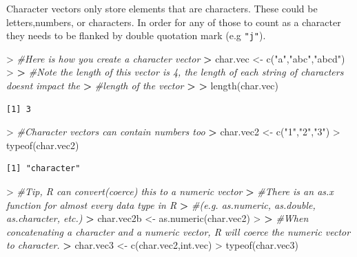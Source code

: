 \documentclass[
]{book}
\newenvironment{Shaded}{\begin{snugshade}}{\end{snugshade}}
\newcommand{\CommentTok}[1]{\textcolor[rgb]{0.56,0.35,0.01}{\textit{#1}}}
\newcommand{\ErrorTok}[1]{\textcolor[rgb]{0.64,0.00,0.00}{\textbf{#1}}}
\newcommand{\FunctionTok}[1]{\textcolor[rgb]{0.00,0.00,0.00}{#1}}
\newcommand{\NormalTok}[1]{#1}
\newcommand{\OtherTok}[1]{\textcolor[rgb]{0.56,0.35,0.01}{#1}}
\newcommand{\SpecialCharTok}[1]{\textcolor[rgb]{0.00,0.00,0.00}{#1}}
\newcommand{\StringTok}[1]{\textcolor[rgb]{0.31,0.60,0.02}{#1}}
\theoremstyle{definition}
\theoremstyle{definition}
\theoremstyle{definition}
\theoremstyle{definition}
\theoremstyle{remark}
\begin{document}
Character vectors only store elements that are characters. These could be letters,numbers, or characters. In order for any
of those to count as a character they needs to be flanked by double quotation mark (e.g \texttt{"j"}).

\begin{Shaded}
\begin{Highlighting}[]
\SpecialCharTok{\textgreater{}} \CommentTok{\#Here is how you create a character vector}
\ErrorTok{\textgreater{}}\NormalTok{ char.vec }\OtherTok{\textless{}{-}} \FunctionTok{c}\NormalTok{(}\StringTok{"a"}\NormalTok{,}\StringTok{"abc"}\NormalTok{,}\StringTok{"abcd"}\NormalTok{)}
\SpecialCharTok{\textgreater{}} 
\ErrorTok{\textgreater{}} \CommentTok{\#Note the length of this vector is 4, the length of each string of characters doesn\textquotesingle{}t impact the }
\ErrorTok{\textgreater{}} \CommentTok{\#length of the vector}
\ErrorTok{\textgreater{}} 
\ErrorTok{\textgreater{}} \FunctionTok{length}\NormalTok{(char.vec)}
\end{Highlighting}
\end{Shaded}

\begin{verbatim}
[1] 3
\end{verbatim}

\begin{Shaded}
\begin{Highlighting}[]
\SpecialCharTok{\textgreater{}} \CommentTok{\#Character vectors can contain numbers too}
\ErrorTok{\textgreater{}}\NormalTok{ char.vec2 }\OtherTok{\textless{}{-}} \FunctionTok{c}\NormalTok{(}\StringTok{"1"}\NormalTok{,}\StringTok{"2"}\NormalTok{,}\StringTok{"3"}\NormalTok{)}
\SpecialCharTok{\textgreater{}} \FunctionTok{typeof}\NormalTok{(char.vec2)}
\end{Highlighting}
\end{Shaded}

\begin{verbatim}
[1] "character"
\end{verbatim}

\begin{Shaded}
\begin{Highlighting}[]
\SpecialCharTok{\textgreater{}} \CommentTok{\#Tip, R can convert(coerce) this to a numeric vector}
\ErrorTok{\textgreater{}} \CommentTok{\#There is an as.x function for almost every data type in R }
\ErrorTok{\textgreater{}} \CommentTok{\#(e.g. as.numeric, as.double, as.character, etc.)}
\ErrorTok{\textgreater{}}\NormalTok{ char.vec2b }\OtherTok{\textless{}{-}} \FunctionTok{as.numeric}\NormalTok{(char.vec2)}
\SpecialCharTok{\textgreater{}} 
\ErrorTok{\textgreater{}} \CommentTok{\#When concatenating a character and a numeric vector, R will coerce the numeric vector to character.}
\ErrorTok{\textgreater{}}\NormalTok{ char.vec3 }\OtherTok{\textless{}{-}} \FunctionTok{c}\NormalTok{(char.vec2,int.vec)}
\SpecialCharTok{\textgreater{}} \FunctionTok{typeof}\NormalTok{(char.vec3)}
\end{Highlighting}
\end{Shaded}
\end{document}
